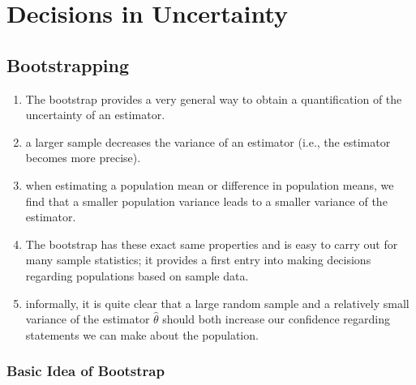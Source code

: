 \chapter{Decisions in Uncertainty}


\section{Bootstrapping}

\begin{enumerate}
    \item  The bootstrap provides a very general way to obtain a quantification of the uncertainty of an estimator.
    \hfill \cite{statistics/book/Statistics-for-Data-Scientists/Maurits-Kaptein}

    \item a larger sample decreases the variance of an estimator (i.e., the estimator becomes more precise).
    \hfill \cite{statistics/book/Statistics-for-Data-Scientists/Maurits-Kaptein}

    \item when estimating a population mean or difference in population means, we find that a smaller population variance leads to a smaller variance of the estimator.
    \hfill \cite{statistics/book/Statistics-for-Data-Scientists/Maurits-Kaptein}

    \item  The bootstrap has these exact same properties and is easy to carry out for many sample statistics; it provides a first entry into making decisions regarding populations based on sample data.
    \hfill \cite{statistics/book/Statistics-for-Data-Scientists/Maurits-Kaptein}

    \item  informally, it is quite clear that a large random sample and a relatively small variance of the estimator $\hat{\theta}$ should both increase our confidence regarding statements we can make about the population.
    \hfill \cite{statistics/book/Statistics-for-Data-Scientists/Maurits-Kaptein}

\end{enumerate}

\subsection{Basic Idea of Bootstrap}

